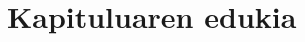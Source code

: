 


\maketitle

\tableofcontents
\etocsettocstyle
  {\section*{Kapituluaren edukia}}
  {} %

\listoffigures

\listoftables

\listoflistings





\appendix




\printglossary[type=\glsxtrabbrvtype]

\printbibliography[heading=bibintoc]


